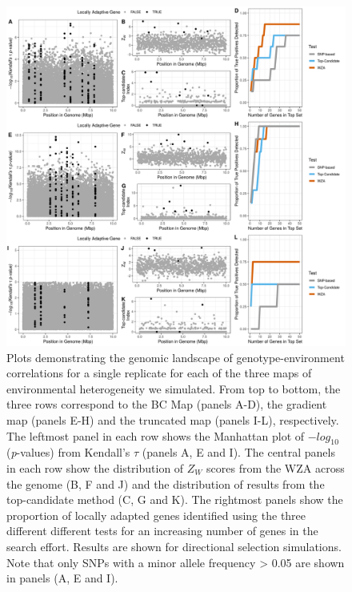 \documentclass[10pt,twoside,lineno]{GSA_format}
\begin{document}
\begin{figure}[H]
  \includegraphics[width=\textwidth,keepaspectratio]{Plots/ThreeRowDemoPlot.png}
  \caption{Plots demonstrating the genomic landscape of genotype-environment correlations for a single replicate for each of the three maps of environmental heterogeneity we simulated. From top to bottom, the three rows correspond to the BC Map (panels A-D), the gradient map (panels E-H) and the truncated map (panels I-L), respectively. The leftmost panel in each row shows the Manhattan plot of $-log_{10}$(\textit{p}-values) from Kendall's $\tau$ (panels A, E and I). The central panels in each row show the distribution of $Z_W$ scores from the WZA across the genome (B, F and J) and the distribution of results from the top-candidate method (C, G and K). The rightmost panels show the proportion of locally adapted genes identified using the three different different tests for an increasing number of genes in the search effort. Results are shown for directional selection simulations. Note that only SNPs with a minor allele frequency > 0.05 are shown in panels (A, E and I).}

  \label{fig:demoPlots}
\end{figure}

\pagebreak
\end{document}
